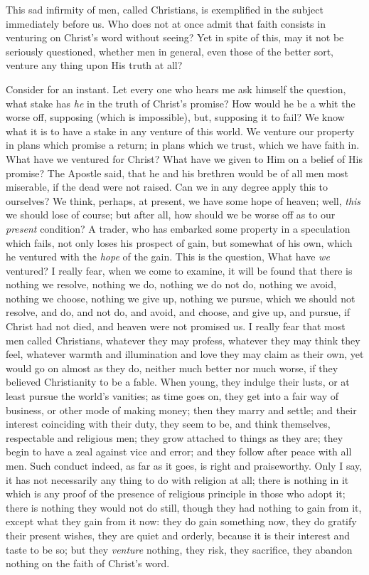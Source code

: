 This sad infirmity of men, called Christians, is exemplified in the
subject immediately before us. Who does not at once admit that faith
consists in venturing on Christ's word without seeing? Yet in spite of
this, may it not be seriously questioned, whether men in general, even
those of the better sort, venture any thing upon His truth at all?

Consider for an instant. Let every one who hears me ask himself the
question, what stake has \emph{he} in the truth of Christ's promise?
How would he be a whit the worse off, supposing (which is impossible),
but, supposing it to fail? We know what it is to have a stake in any
venture of this world. We venture our property in plans which promise
a return; in plans which we trust, which we have faith in. What have
we ventured for Christ? What have we given to Him on a belief of His
promise? The Apostle said, that he and his brethren would be of all
men most miserable, if the dead were not raised. Can we in any degree
apply this to ourselves? We think, perhaps, at present, we have some
hope of heaven; well, \emph{this} we should lose of course; but after all,
how should we be worse off as to our \emph{present} condition? A trader, who
has embarked some property in a speculation which fails, not only
loses his prospect of gain, but somewhat of his own, which he ventured
with the \emph{hope} of the gain. This is the question, What have \emph{we}
ventured? I really fear, when we come to examine, it will be found
that there is nothing we resolve, nothing we do, nothing we do not do,
nothing we avoid, nothing we choose, nothing we give up, nothing we
pursue, which we should not resolve, and do, and not do, and avoid,
and choose, and give up, and pursue, if Christ had not died, and
heaven were not promised us. I really fear that most men called
Christians, whatever they may profess, whatever they may think they
feel, whatever warmth and illumination and love they may claim as
their own, yet would go on almost as they do, neither much better nor
much worse, if they believed Christianity to be a fable. When young,
they indulge their lusts, or at least pursue the world's vanities; as
time goes on, they get into a fair way of business, or other mode of
making money; then they marry and settle; and their interest
coinciding with their duty, they seem to be, and think themselves,
respectable and religious men; they grow attached to things as they
are; they begin to have a zeal against vice and error; and they follow
after peace with all men. Such conduct indeed, as far as it goes, is
right and praiseworthy. Only I say, it has not necessarily any thing
to do with religion at all; there is nothing in it which is any proof
of the presence of religious principle in those who adopt it; there is
nothing they would not do still, though they had nothing to gain from
it, except what they gain from it now: they do gain something now,
they do gratify their present wishes, they are quiet and orderly,
because it is their interest and taste to be so; but they \emph{venture}
nothing, they risk, they sacrifice, they abandon nothing on the faith
of Christ's word.

